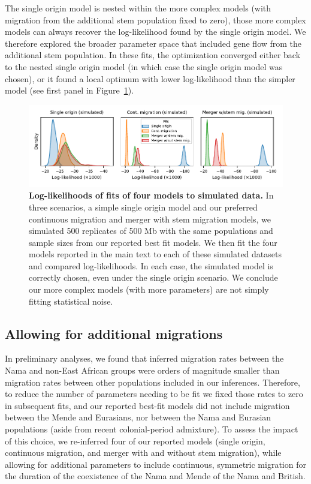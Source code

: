 \documentclass[]{article}
\begin{document}
The single origin model is nested within the more complex models (with
migration from the additional stem population fixed to zero), those more
complex models can always recover the log-likelihood found by the single origin
model. We therefore explored the broader parameter space that included gene
flow from the additional stem population. In these fits, the optimization
converged either back to the nested single origin model (in which case the
single origin model was chosen), or it found a local optimum with lower
log-likelihood than the simpler model (see first panel in
Figure~\ref{fig:refit-lls}).

\begin{figure}[ht!]
    \centering
    \includegraphics{./figures/supp-refit-lls.pdf}
    \caption{
        \textbf{Log-likelihoods of fits of four models to simulated data.} In
        three scenarios, a simple single origin model and our preferred
        continuous migration and merger with stem migration models, we
        simulated 500 replicates of 500 Mb with the same populations and sample
        sizes from our reported best fit models. We then fit the four models
        reported in the main text to each of these simulated datasets and
        compared log-likelihoods. In each case, the simulated model is
        correctly chosen, even under the single origin scenario. We conclude
        our more complex models (with more parameters) are not simply fitting
        statistical noise.
    }
    \label{fig:refit-lls}
\end{figure}


\subsection{Allowing for additional migrations}

In preliminary analyses, we found that inferred migration rates between the
Nama and non-East African groups were orders of magnitude smaller than
migration rates between other populations included in our inferences.
Therefore, to reduce the number of parameters needing to be fit we fixed those
rates to zero in subsequent fits, and our reported best-fit models did not
include migration between the Mende and Eurasians, nor between the Nama and
Eurasian populations (aside from recent colonial-period admixture). To assess
the impact of this choice, we re-inferred four of our reported models (single
origin, continuous migration, and merger with and without stem migration),
while allowing for additional parameters to include continuous, symmetric
migration for the duration of the coexistence of the Nama and Mende of the Nama
and British.
\end{document}
